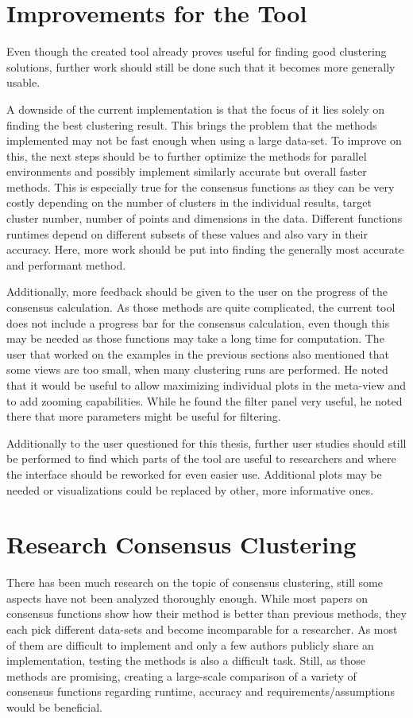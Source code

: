 \documentclass[
	a4paper,
	english,
	twoside,
	openright,               
	11pt                            
	]{report}
\begin{document}
\section{Improvements for the Tool}
Even though the created tool already proves useful for finding good clustering solutions, further work should still be done such that it becomes more generally usable. 

A downside of the current implementation is that the focus of it lies solely on finding the best clustering result. This brings the problem that the methods implemented may not be fast enough when using a large data-set. To improve on this, the next steps should be to further optimize the methods for parallel environments and possibly implement similarly accurate but overall faster methods. This is especially true for the consensus functions as they can be very costly depending on the number of clusters in the individual results, target cluster number, number of points and dimensions in the data. Different functions runtimes depend on different subsets of these values and also vary in their accuracy. Here, more work should be put into finding the generally most accurate and performant method.

Additionally, more feedback should be given to the user on the progress of the consensus calculation. As those methods are quite complicated, the current tool does not include a progress bar for the consensus calculation, even though this may be needed as those functions may take a long time for computation. The user that worked on the examples in the previous sections also mentioned that some views are too small, when many clustering runs are performed. He noted that it would be useful to allow maximizing individual plots in the meta-view and to add zooming capabilities. While he found the filter panel very useful, he noted there that more parameters might be useful for filtering.

Additionally to the user questioned for this thesis, further user studies should still be performed to find which parts of the tool are useful to researchers and where the interface should be reworked for even easier use. Additional plots may be needed or visualizations could be replaced by other, more informative ones.

\section{Research Consensus Clustering}
There has been much research on the topic of consensus clustering, still some aspects have not been analyzed thoroughly enough. While most papers on consensus functions show how their method is better than previous methods, they each pick different data-sets and become incomparable for a researcher. As most of them are difficult to implement and only a few authors publicly share an implementation, testing the methods is also a difficult task. Still, as those methods are promising, creating a large-scale comparison of a variety of consensus functions regarding runtime, accuracy and requirements/assumptions would be beneficial.
\end{document}
